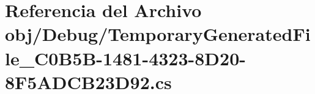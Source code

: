 \hypertarget{Debug_2TemporaryGeneratedFile__036C0B5B-1481-4323-8D20-8F5ADCB23D92_8cs}{}\section{Referencia del Archivo obj/\+Debug/\+Temporary\+Generated\+File\+\_\+C0\+B5\+B-\/1481-\/4323-\/8\+D20-\/8\+F5\+A\+D\+C\+B23\+D92.cs}
\label{Debug_2TemporaryGeneratedFile__036C0B5B-1481-4323-8D20-8F5ADCB23D92_8cs}
